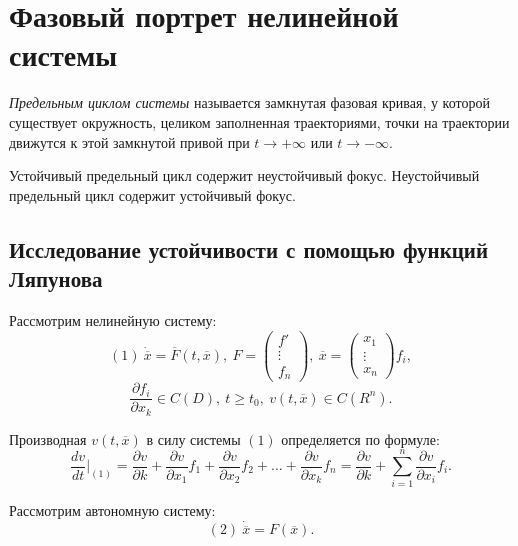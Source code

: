 \newpage



\section{Фазовый портрет нелинейной системы}

\begin{definition}
	\emph{Предельным циклом системы} называется замкнутая фазовая кривая, у которой существует окружность, целиком заполненная траекториями, точки на траектории движутся к этой замкнутой привой при $t \rightarrow +\infty $ или $t \rightarrow - \infty $.
\end{definition}

\begin{note}
	Устойчивый предельный цикл содержит неустойчивый фокус. Неустойчивый предельный цикл содержит устойчивый фокус.
\end{note}

\subsection{Исследование устойчивости с помощью функций Ляпунова}

Рассмотрим нелинейную систему:
\[
	(1) \ \dot{\overline{x} } = \overline{F} (t,\overline{x} ), \ F = \left(\begin{array}{c}
			f ' \\ \vdots \\ f_n
		\end{array}\right), \ \overline{x} = \left(\begin{array}{c}
			x_1 \\ \vdots \\ x_n
		\end{array}\right)f_i,
\]
\[
	\frac{\partial f_i}{\partial x_k} \in C(D), \ t \geqslant t_0, \ v(t,\overline{x} )\in C(R^{n} ).
\]

\begin{definition}
	Производная $v(t,\overline{x} )$ в силу системы $(1)$ определяется по формуле:
	\[
		\frac{dv}{dt} \Big|_{(1)} = \frac{\partial v}{\partial k} + \frac{\partial v}{\partial x_1} f_1 + \frac{\partial v}{\partial x_2} f_2 + \ldots + \frac{\partial v}{\partial x_k} f_n = \frac{\partial v}{\partial k} + \sum_{i=1}^{n} \frac{\partial v}{\partial x_i} f_i.
	\]
\end{definition}

Рассмотрим автономную систему:
\[
	(2) \ \dot{\overline{x} } = F(\overline{x} ).
\]

